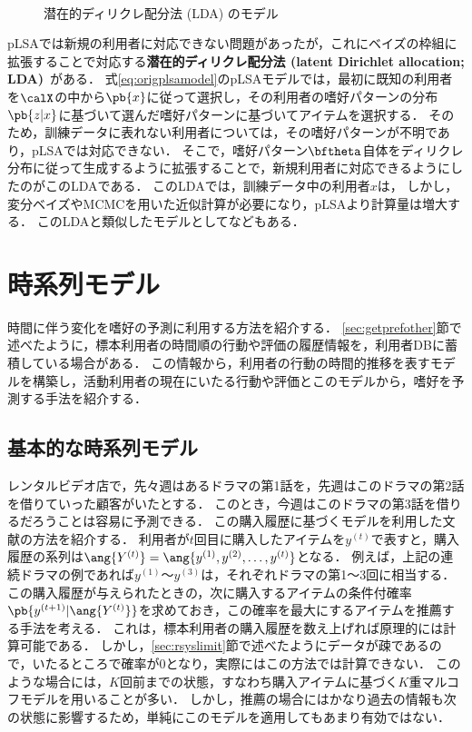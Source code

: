 \begin{figure}
\centering
{}\\
\caption{潜在的ディリクレ配分法 (LDA) のモデル\cite{jmlr:03:05}}
\label{fig:lda}
\end{figure}

pLSAでは新規の利用者に対応できない問題があったが，これにベイズの枠組に拡張することで対応する\textbf{潜在的ディリクレ配分法 (latent Dirichlet allocation; LDA)}~\cite{jmlr:03:05}がある．
式\eqref{eq:origplsamodel}のpLSAモデルでは，最初に既知の利用者を$\calX$の中から$\pb{x}$に従って選択し，その利用者の嗜好パターンの分布$\pb{z|x}$に基づいて選んだ嗜好パターンに基づいてアイテムを選択する．
そのため，訓練データに表れない利用者については，その嗜好パターンが不明であり，pLSAでは対応できない．
そこで，嗜好パターン$\bftheta$自体をディリクレ分布に従って生成するように拡張することで，新規利用者に対応できるようにしたのがこのLDAである．
このLDAでは，訓練データ中の利用者$x$は，
しかし，変分ベイズやMCMCを用いた近似計算が必要になり，pLSAより計算量は増大する．
このLDAと類似したモデルとして\cite{icml:04:07}などもある．


\section{時系列モデル}
\label{sec:timeseries}

時間に伴う変化を嗜好の予測に利用する方法を紹介する．
\ref{sec:getprefother}節で述べたように，標本利用者の時間順の行動や評価の履歴情報を，利用者DBに蓄積している場合がある．
この情報から，利用者の行動の時間的推移を表すモデルを構築し，活動利用者の現在にいたる行動や評価とこのモデルから，嗜好を予測する手法を紹介する．

\subsection{基本的な時系列モデル}

レンタルビデオ店で，先々週はあるドラマの第1話を，先週はこのドラマの第2話を借りていった顧客がいたとする．
このとき，今週はこのドラマの第3話を借りるだろうことは容易に予測できる．
この購入履歴に基づくモデルを利用した文献\cite{nips:03:03}の方法を紹介する．
利用者が$t$回目に購入したアイテムを$y^{(t)}$で表すと，購入履歴の系列は$\ang{Y^{(t)}}=\ang{y^{(1)},y^{(2)},\dotsc,y^{(t)}}$となる．
例えば，上記の連続ドラマの例であれば$y^{(1)}$〜$y^{(3)}$は，それぞれドラマの第1〜3回に相当する．
この購入履歴が与えられたときの，次に購入するアイテムの条件付確率$\pb{y^{(t+1)}|\ang{Y^{(t)}}}$を求めておき，この確率を最大にするアイテムを推薦する手法を考える．
これは，標本利用者の購入履歴を数え上げれば原理的には計算可能である．
しかし，\ref{sec:rsyslimit}節で述べたようにデータが疎であるので，いたるところで確率が$0$となり，実際にはこの方法では計算できない．
このような場合には，$K$回前までの状態，すなわち購入アイテムに基づく$K$重マルコフモデルを用いることが多い．
しかし，推薦の場合にはかなり過去の情報も次の状態に影響するため，単純にこのモデルを適用してもあまり有効ではない．

